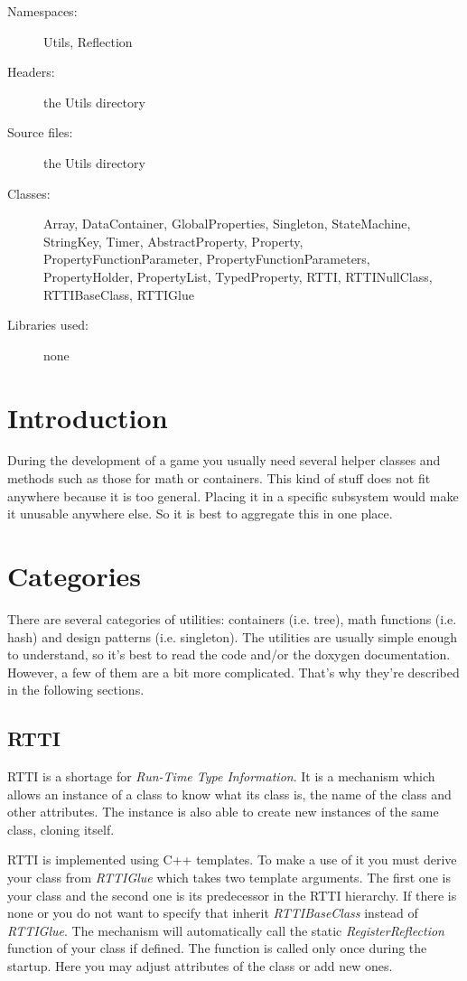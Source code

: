 \begin{description}
  \item[Namespaces:] Utils, Reflection
  \item[Headers:] the Utils directory
  \item[Source files:] the Utils directory
  \item[Classes:] Array, DataContainer, GlobalProperties, Singleton, StateMachine, StringKey, Timer, AbstractProperty, Property, PropertyFunctionParameter, PropertyFunctionParameters, PropertyHolder, PropertyList, TypedProperty, RTTI, RTTINullClass, RTTIBaseClass, RTTIGlue
  \item[Libraries used:] none
\end{description}


\section{Introduction}
During the development of a game you usually need several helper classes and methods such as those for math or containers. This kind of stuff does not fit anywhere because it is too general. Placing it in a specific subsystem would make it unusable anywhere else. So it is best to aggregate this in one place.



\section{Categories}
There are several categories of utilities: containers (i.e. tree), math functions (i.e. hash) and design patterns (i.e. singleton). The utilities are usually simple enough to understand, so it's best to read the code and/or the doxygen documentation. However, a few of them are a bit more complicated. That's why they're described in the following sections.


\subsection{RTTI}
RTTI is a shortage for \emph{Run-Time Type Information}. It is a mechanism which allows an instance of a class to know what its class is, the name of the class and other attributes. The instance is also able to create new instances of the same class, cloning itself.

RTTI is implemented using C++ templates. To make a use of it you must derive your class from \emph{RTTIGlue} which takes two template arguments. The first one is your class and the second one is its predecessor in the RTTI hierarchy. If there is none or you do not want to specify that inherit \emph{RTTIBaseClass} instead of \emph{RTTIGlue}. The mechanism will automatically call the static \emph{RegisterReflection} function of your class if defined. The function is called only once during the startup. Here you may adjust attributes of the class or add new ones.


